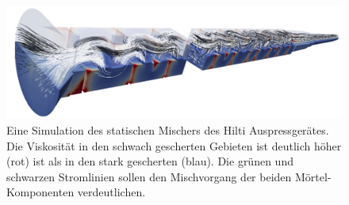 \begin{table}[tb]
\noindent{}
    \caption{Die gemessenen und simulierten Konfigurationen des Mischers mit den rein scherratenabhängigen Modellen. Die angegebene Einlassgeschwindigkeit entspricht dabei der Kolbengeschwindigkeit in der FEP.}
    \label{fig:mischerVergleich}
\end{table}
%
\begin{figure}[htb]
    \centering
    \includegraphics[width=\textwidth]{figures/MischerSimResult.png}
    \caption{Eine Simulation des statischen Mischers des Hilti Auspressgerätes. Die Viskosität in den schwach gescherten Gebieten ist deutlich höher (rot) ist als in den stark gescherten (blau). Die grünen und schwarzen Stromlinien sollen den Mischvorgang der beiden Mörtel-Komponenten verdeutlichen.}
    \label{fig:mischerSimResult}
\end{figure}
